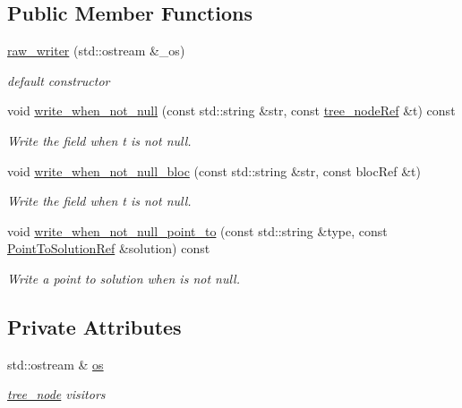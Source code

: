 \subsection*{Public Member Functions}
\begin{DoxyCompactItemize}
\item 
\hyperlink{structraw__writer_a2b1040098c68a5cbcfa9a931e945d01d}{raw\+\_\+writer} (std\+::ostream \&\+\_\+os)
\begin{DoxyCompactList}\small\item\em default constructor \end{DoxyCompactList}\item 
void \hyperlink{structraw__writer_ace83fca22bfc78a66753b8645278a6b0}{write\+\_\+when\+\_\+not\+\_\+null} (const std\+::string \&str, const \hyperlink{tree__node_8hpp_a6ee377554d1c4871ad66a337eaa67fd5}{tree\+\_\+node\+Ref} \&t) const
\begin{DoxyCompactList}\small\item\em Write the field when t is not null. \end{DoxyCompactList}\item 
void \hyperlink{structraw__writer_ad0a69a584f6faa81edfbbe6fff8a7782}{write\+\_\+when\+\_\+not\+\_\+null\+\_\+bloc} (const std\+::string \&str, const bloc\+Ref \&t)
\begin{DoxyCompactList}\small\item\em Write the field when t is not null. \end{DoxyCompactList}\item 
void \hyperlink{structraw__writer_a2f2a7a94272d8523d9e4ca3f6674ceba}{write\+\_\+when\+\_\+not\+\_\+null\+\_\+point\+\_\+to} (const std\+::string \&type, const \hyperlink{tree__node_8hpp_a4b5be0c528f25b8cb0b0fbc3b957d725}{Point\+To\+Solution\+Ref} \&solution) const
\begin{DoxyCompactList}\small\item\em Write a point to solution when is not null. \end{DoxyCompactList}\end{DoxyCompactItemize}
\subsection*{Private Attributes}
\begin{DoxyCompactItemize}
\item 
std\+::ostream \& \hyperlink{structraw__writer_a118dafa43d8fda99b76fdea39bad99a7}{os}
\begin{DoxyCompactList}\small\item\em \hyperlink{classtree__node}{tree\+\_\+node} visitors \end{DoxyCompactList}\end{DoxyCompactItemize}



